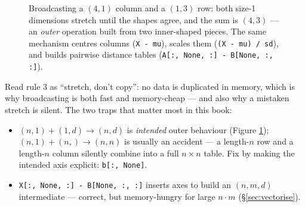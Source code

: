 \begin{figure}[ht]\centering
{}
\caption{Broadcasting a $(4,1)$ column and a $(1,3)$ row: both size-1
dimensions stretch until the shapes agree, and the sum is $(4,3)$ --- an
\emph{outer} operation built from two inner-shaped pieces. The same mechanism
centres columns (\texttt{X - mu}), scales them (\texttt{(X - mu) / sd}), and
builds pairwise distance tables (\texttt{A[:, None, :] - B[None, :, :]}).
}\label{fig:broadcast}
\end{figure}

Read rule 3 as ``stretch, don't copy'': no data is duplicated in memory, which
is why broadcasting is both fast and memory-cheap --- and also why a mistaken
stretch is silent. The two traps that matter most in this book:

\begin{itemize}
\item $(n,1)+(1,d)\to(n,d)$ is \emph{intended} outer behaviour (Figure
  \ref{fig:broadcast}); $(n,1)+(n,)\to(n,n)$ is usually an accident --- a
  length-$n$ row and a length-$n$ column silently combine into a full $n\times
  n$ table. Fix by making the intended axis explicit: \texttt{b[:, None]}.
\item \texttt{X[:, None, :] - B[None, :, :]} inserts axes to build an
  $(n,m,d)$ intermediate --- correct, but memory-hungry for large $n\cdot m$
  (\S\ref{sec:vectorise}).
\end{itemize}

